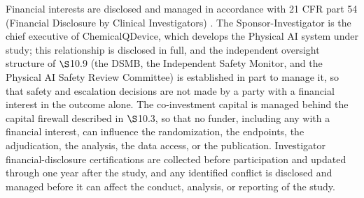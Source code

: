 Financial interests are disclosed and managed in accordance with 21 CFR part 54
(Financial Disclosure by Clinical Investigators) \cite{ecfr2026part54}. The
Sponsor-Investigator is the chief executive of ChemicalQDevice, which develops the
Physical AI system under study; this relationship is disclosed in full, and the
independent oversight structure of $\S$10.9 (the DSMB, the Independent Safety
Monitor, and the Physical AI Safety Review Committee) is established in part to
manage it, so that safety and escalation decisions are not made by a party with a
financial interest in the outcome alone. The co-investment capital is managed behind
the capital firewall described in $\S$10.3, so that no funder, including any with a
financial interest, can influence the randomization, the endpoints, the
adjudication, the analysis, the data access, or the publication. Investigator
financial-disclosure certifications are collected before participation and updated
through one year after the study, and any identified conflict is disclosed and
managed before it can affect the conduct, analysis, or reporting of the study.
